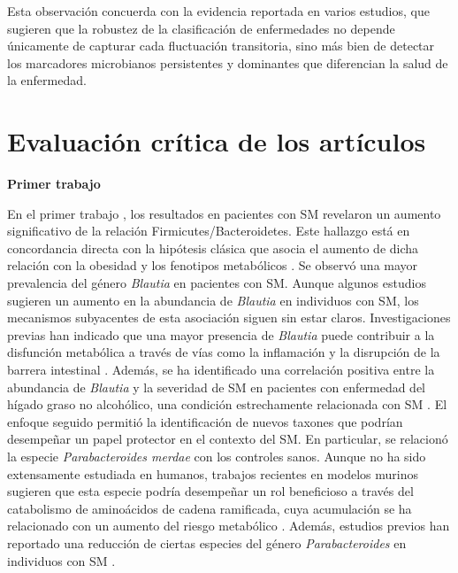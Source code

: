 Esta observación concuerda con la evidencia reportada en varios estudios, que sugieren que la robustez de la clasificación de enfermedades no depende únicamente de capturar cada fluctuación transitoria, sino más bien de detectar los marcadores microbianos persistentes y dominantes que diferencian la salud de la enfermedad.


\section{Evaluación crítica de los artículos}

\textbf{Primer trabajo}

En el primer trabajo \cite{paper1}, los resultados en pacientes con SM revelaron un aumento significativo de la relación Firmicutes/Bacteroidetes. Este hallazgo está en concordancia directa con la hipótesis clásica que asocia el aumento de dicha relación con la obesidad y los fenotipos metabólicos \cite{santos2019role, baghi2022evaluation}. Se observó una mayor prevalencia del género \textit{Blautia} en pacientes con SM. Aunque algunos estudios sugieren un aumento en la abundancia de \textit{Blautia} en individuos con SM, los mecanismos subyacentes de esta asociación siguen sin estar claros. Investigaciones previas han indicado que una mayor presencia de \textit{Blautia} puede contribuir a la disfunción metabólica a través de vías como la inflamación y la disrupción de la barrera intestinal \cite{Liu2021}. Además, se ha identificado una correlación positiva entre la abundancia de \textit{Blautia} y la severidad de SM en pacientes con enfermedad del hígado graso no alcohólico, una condición estrechamente relacionada con SM \citep{shen2017gut, Wang2016}. El enfoque seguido permitió la identificación de nuevos taxones que podrían desempeñar un papel protector en el contexto del SM. En particular, se relacionó la especie \textit{Parabacteroides merdae} con los controles sanos. Aunque no ha sido extensamente estudiada en humanos, trabajos recientes en modelos murinos sugieren que esta especie podría desempeñar un rol beneficioso a través del catabolismo de aminoácidos de cadena ramificada, cuya acumulación se ha relacionado con un aumento del riesgo metabólico \cite{qiao2022gut}. Además, estudios previos han reportado una reducción de ciertas especies del género \textit{Parabacteroides} en individuos con SM \cite{cui2022roles}.

